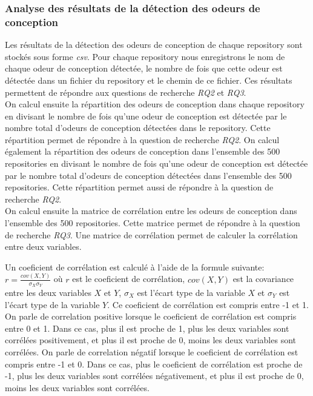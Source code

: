 \subsubsection{Analyse des résultats de la détection des odeurs de conception}
\label{sec:Analyse des résultats de la détection des odeurs de conception}
Les résultats de la détection des odeurs de conception de chaque repository sont
stockés sous forme \emph{csv}. Pour chaque repository nous enregistrons le nom de
chaque odeur de conception détectée, le nombre de fois que cette odeur est
détectée dans un fichier du repository et le chemin de ce fichier. Ces résultats
permettent de répondre aux questions de recherche \emph{RQ2} et \emph{RQ3}.\\
On calcul ensuite la répartition des odeurs de conception dans chaque repository
en divisant le nombre de fois qu'une odeur de conception est détectée par le
nombre total d'odeurs de conception détectées dans le repository. Cette
répartition permet de répondre à la question de recherche \emph{RQ2}. On
calcul également la répartition des odeurs de conception dans l'ensemble des 500
repositories en divisant le nombre de fois qu'une odeur de conception est
détectée par le nombre total d'odeurs de conception détectées dans l'ensemble
des 500 repositories. Cette répartition permet aussi de répondre à la
question de recherche \emph{RQ2}.\\

On calcul ensuite la matrice de corrélation entre les odeurs de conception dans
l'ensemble des 500 repositories. Cette matrice permet de répondre à la question
de recherche \emph{RQ3}. Une matrice de corrélation permet
de calculer la corrélation entre deux variables.

Un coeficient de corrélation est calculé à l'aide de la formule suivante:  $r =
  \frac{cov(X,Y)}{\sigma_X \sigma_Y}$  où $r$ est le coeficient de corrélation, $cov(X,Y)$ est la covariance entre les
deux variables $X$ et $Y$, $\sigma_X$ est l'écart type de la variable $X$ et
$\sigma_Y$ est l'écart type de la variable $Y$. Ce coeficient de corrélation est
compris entre -1 et 1. On parle de correlation positive lorsque le coeficient de
corrélation est compris entre 0 et 1. Dans ce cas, plus il est proche de 1, plus les deux variables sont
corrélées positivement, et plus il est proche de 0, moins les deux variables sont
corrélées. On parle de correlation négatif lorsque le coeficient de corrélation
est compris entre -1 et 0. Dans ce cas, plus le coeficient de corrélation est
proche de -1, plus les deux variables sont corrélées négativement, et plus il
est proche de 0, moins les deux variables sont corrélées.\\



